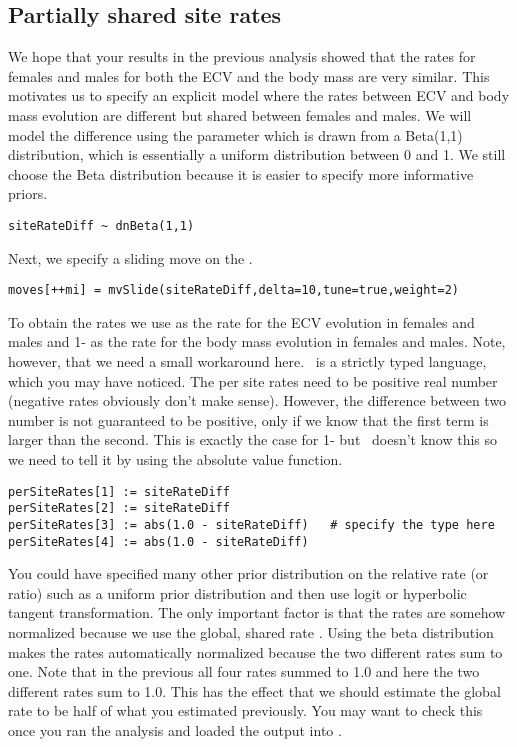 \vspace{5cm}


\subsection{Partially shared site rates}
We hope that your results in the previous analysis showed that the rates for females and males for both the ECV and the body mass are very similar.
This motivates us to specify an explicit model where the rates between ECV and body mass evolution are different but shared between females and males.
We will model the difference using the  parameter which is drawn from a Beta(1,1) distribution, which is essentially a uniform distribution between 0 and 1.
We still choose the Beta distribution because it is easier to specify more informative priors.
{\tt \small \begin{snugshade*}
\begin{lstlisting}
siteRateDiff ~ dnBeta(1,1)
\end{lstlisting}
\end{snugshade*}}
Next, we specify a sliding move on the .
{\tt \small \begin{snugshade*}
\begin{lstlisting}
moves[++mi] = mvSlide(siteRateDiff,delta=10,tune=true,weight=2)
\end{lstlisting}
\end{snugshade*}}
To obtain the rates we use  as the rate for the ECV evolution in females and males and 1- as the rate for the body mass evolution in females and males.
Note, however, that we need a small workaround here. \Rev~is a strictly typed language, which you may have noticed. The per site rates need to be positive real number (negative rates obviously don't make sense). However, the difference between two number is not guaranteed to be positive, only if we know that the first term is larger than the second. This is exactly the case for 1- but \RevBayes~doesn't know this so we need to tell it by using the absolute value  function.
{\tt \small \begin{snugshade*}
\begin{lstlisting}
perSiteRates[1] := siteRateDiff
perSiteRates[2] := siteRateDiff
perSiteRates[3] := abs(1.0 - siteRateDiff)   # specify the type here
perSiteRates[4] := abs(1.0 - siteRateDiff)
\end{lstlisting}
\end{snugshade*}}
You could have specified many other prior distribution on the relative rate (or ratio) such as a uniform prior distribution and then use logit or hyperbolic tangent transformation.
The only important factor is that the rates are somehow normalized because we use the global, shared rate .
Using the beta distribution makes the rates automatically normalized because the two different rates sum to one. Note that in the previous all four rates summed to 1.0 and here the two different rates sum to 1.0. This has the effect that we should estimate the global rate  to be half of what you estimated previously. You may want to check this once you ran the analysis and loaded the output into \Tracer. 


